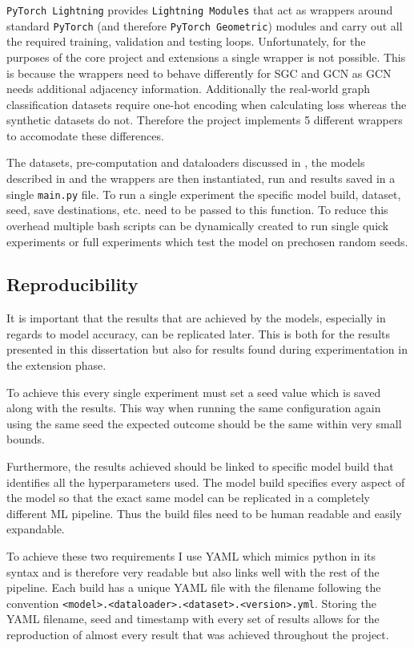 \texttt{PyTorch Lightning} provides \texttt{Lightning Modules} that act as wrappers around standard \texttt{PyTorch} (and therefore \texttt{PyTorch Geometric}) modules and carry out all the required training, validation and testing loops.
Unfortunately, for the purposes of the core project and extensions a single wrapper is not possible.
This is because the wrappers need to behave differently for SGC and GCN as GCN needs additional adjacency information.
Additionally the real-world graph classification datasets require one-hot encoding when calculating loss whereas the synthetic datasets do not.
Therefore the project implements 5 different wrappers to accomodate these differences.

The datasets, pre-computation and dataloaders discussed in , the models described in  and the wrappers are then instantiated, run and results saved in a single \texttt{main.py} file.
To run a single experiment the specific model build, dataset, seed, save destinations, etc. need to be passed to this function.
To reduce this overhead multiple bash scripts can be dynamically created to run single quick experiments or full experiments which test the model on prechosen random seeds.

\subsection{Reproducibility}
\label{sec:reproducibility}
It is important that the results that are achieved by the models, especially in regards to model accuracy, can be replicated later.
This is both for the results presented in this dissertation but also for results found during experimentation in the extension phase.

To achieve this every single experiment must set a seed value which is saved along with the results.
This way when running the same configuration again using the same seed the expected outcome should be the same within very small bounds.

Furthermore, the results achieved should be linked to specific model build that identifies all the hyperparameters used.
The model build specifies every aspect of the model so that the exact same model can be replicated in a completely different ML pipeline.
Thus the build files need to be human readable and easily expandable.

To achieve these two requirements I use YAML which mimics python in its syntax and is therefore very readable but also links well with the rest of the pipeline.
Each build has a unique YAML file with the filename following the convention \texttt{<model>.<dataloader>.<dataset>.<version>.yml}.
Storing the YAML filename, seed and timestamp with every set of results allows for the reproduction of almost every result that was achieved throughout the project.

